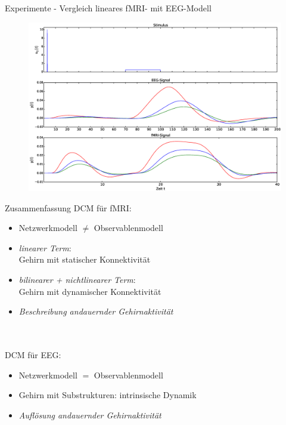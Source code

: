 \documentclass{beamer}
\begin{document}
\begin{frame}{Experimente - Vergleich lineares fMRI- mit EEG-Modell}
\begin{figure}
\centering
\includegraphics[scale=0.25]{res/hemo-EEG-vergleich3.eps}
\end{figure}
\end{frame}

\begin{frame}{Zusammenfassung}
DCM für fMRI:
\begin{itemize}
\item Netzwerkmodell $\neq$ Observablenmodell
\item \textit{linearer Term}:\\ Gehirn mit statischer Konnektivität
\item \textit{bilinearer + nichtlinearer Term}:\\ Gehirn mit dynamischer Konnektivität
\item \textit{Beschreibung andauernder Gehirnaktivität}
\end{itemize}
\pause
~\\~\\
DCM für EEG:
\begin{itemize}
\item Netzwerkmodell $=$ Observablenmodell
\item Gehirn mit Substrukturen: intrinsische Dynamik
\item \textit{Auflösung andauernder Gehirnaktivität} 
\end{itemize}
\end{frame}
\end{document}
